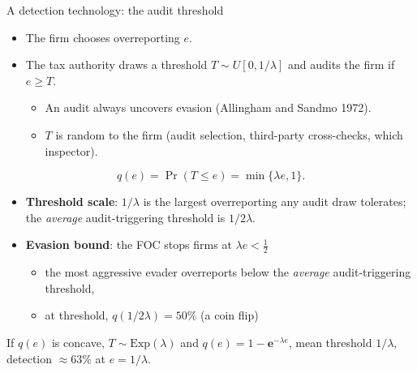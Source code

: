 \documentclass[
  ignorenonframetext,
  aspectratio=169,
]{beamer}
\providecommand{\tightlist}{%
  \setlength{\itemsep}{0pt}\setlength{\parskip}{0pt}}
\begin{document}
\begin{frame}{A detection technology: the audit threshold}
\protect{}\label{a-detection-technology-the-audit-threshold}
\begin{itemize}
\tightlist
\item
  The firm chooses overreporting \(e\).
\item
  The tax authority draws a threshold \(T\sim U[0,1/\lambda]\) and
  audits the firm if \(e\ge T\).

  \begin{itemize}
  \tightlist
  \item
    An audit always uncovers evasion (Allingham and Sandmo 1972).
  \item
    \(T\) is random to the firm (audit selection, third-party
    cross-checks, which inspector).
  \end{itemize}
\end{itemize}

\[
q(e)=\Pr(T\le e)=\min\{\lambda e,1\}.
\]

\begin{itemize}
\tightlist
\item
  \textbf{Threshold scale}: \(1/\lambda\) is the largest overreporting
  any audit draw tolerates; the \emph{average} audit-triggering
  threshold is \(1/2\lambda\).
\item
  \textbf{Evasion bound}: the FOC stops firms at \(\lambda e<\tfrac12\)

  \begin{itemize}
  \tightlist
  \item
    the most aggressive evader overreports below the \emph{average}
    audit-triggering threshold,
  \item
    at threshold, \(q(1/2\lambda)=50\%\) (a coin flip)
  \end{itemize}
\end{itemize}

If \(q(e)\) is concave, \(T\sim\text{Exp}(\lambda)\) and
\(q(e)=1-\textbf{e}^{-\lambda e}\), mean threshold \(1/\lambda\),
detection \(\approx63\%\) at \(e=1/\lambda\).
\end{frame}
\end{document}
